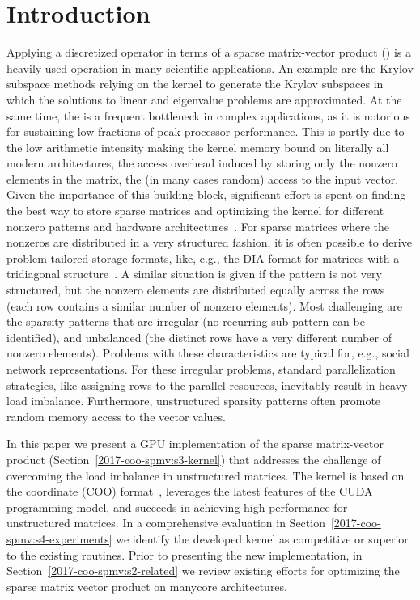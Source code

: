 \section{Introduction}
\label{2017-coo-spmv:s1-intro}
Applying a discretized operator
in terms of a sparse matrix-vector product (\spmv)
is a heavily-used operation in many scientific applications.
An example are the Krylov subspace methods relying on the \spmv kernel
to generate the Krylov subspaces in which the solutions
to linear and eigenvalue problems are approximated.
At the same time, the \spmv is a frequent bottleneck in complex applications,
as it is notorious for sustaining low fractions of peak processor performance.
This is partly due to the low arithmetic intensity making the 
\spmv kernel memory bound on literally all modern architectures,
the access overhead induced by storing only the nonzero elements in the matrix,
the (in many cases random) access to the input vector.
Given the importance of this building block,
significant effort is spent on finding the best way to store
sparse matrices and optimizing the \spmv kernel for
different nonzero patterns and hardware architectures~\cite{garlandspmv,sellpreport,Liu:2015:CES:2751205.2751209}.
For sparse matrices where the nonzeros are distributed in a very 
structured fashion, it is often possible to derive problem-tailored 
storage formats, like, e.g., the DIA format for matrices with a tridiagonal structure~\cite{garlandspmv}.
A similar situation is given if the pattern is not very structured, but the nonzero elements 
are distributed equally across the rows (each row contains 
a similar number of nonzero elements). 
Most challenging are the 
sparsity patterns that are irregular (no recurring sub-pattern can be identified),
and unbalanced (the distinct rows have a very different number of nonzero elements).
Problems with these characteristics are typical for, e.g., social network representations.
For these irregular problems, standard parallelization strategies, 
like assigning rows to the parallel resources,
inevitably result in heavy load imbalance.
Furthermore, unstructured sparsity patterns often promote 
random memory access to the vector values.

In this paper we present
a GPU implementation 
of the sparse matrix-vector product (Section~\ref{2017-coo-spmv:s3-kernel})
that addresses the challenge of overcoming the load imbalance in unstructured
matrices. The kernel is based on the coordinate (COO) format~\cite{garlandspmv}, 
leverages the latest features of the CUDA programming model,
and succeeds in achieving high performance for unstructured matrices.
In a comprehensive evaluation in Section~\ref{2017-coo-spmv:s4-experiments} 
we identify the developed kernel as competitive or superior
to the existing routines.
Prior to presenting the new implementation, in Section~\ref{2017-coo-spmv:s2-related} we
review
existing efforts for optimizing the sparse matrix vector product
on manycore architectures.
